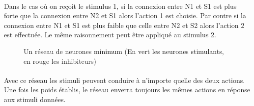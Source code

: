 \paragraph{}
Dans le cas où on reçoit le stimulus 1, si la connexion entre N1 et S1 est
plus forte que la connexion entre N2 et S1 alors l'action 1 est choisie. 
Par contre si la connexion entre N1 et S1 est plus faible que celle entre 
N2 et S2 alors l'action 2 est effectuée. Le même raisonnement peut être 
appliqué au stimulus 2.

\begin{figure}[!h]
  \begin{center}
    
  \end{center}
  \caption{Un réseau de neurones minimum (En vert les neurones stimulants, en rouge les inhibiteurs)}
  \label{reseau2}
\end{figure}

\paragraph{}
Avec ce réseau les stimuli peuvent conduire à n'importe quelle des deux
actions. Une fois les poids établis, le réseau enverra toujours les mêmes
actions en réponse aux stimuli données.
